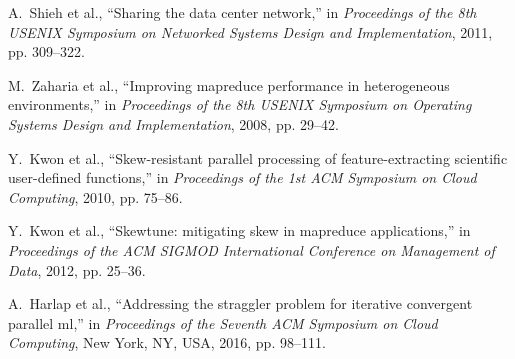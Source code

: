 \documentclass[10pt,journal,compsoc]{IEEEtran}
\begin{document}
\begin{thebibliography}{43}
A.~Shieh et al., ``Sharing the data
  center network,'' in \emph{Proceedings of the 8th USENIX Symposium on
  Networked Systems Design and Implementation}, 2011, pp. 309--322.

M.~Zaharia et al., ``Improving
  mapreduce performance in heterogeneous environments,'' in \emph{Proceedings
  of the 8th USENIX Symposium on Operating Systems Design and Implementation},
  2008, pp. 29--42.

Y.~Kwon et al., ``Skew-resistant parallel
  processing of feature-extracting scientific user-defined functions,'' in
  \emph{Proceedings of the 1st ACM Symposium on Cloud Computing}, 2010, pp. 75--86.

Y.~Kwon et al., ``Skewtune: mitigating skew in mapreduce applications,'' in
  \emph{Proceedings of the ACM SIGMOD International Conference on Management of
  Data}, 2012, pp. 25--36.

A.~Harlap et al., ``Addressing the straggler problem for iterative convergent
  parallel ml,'' in \emph{Proceedings of the Seventh ACM Symposium on Cloud
  Computing}, New York, NY, USA, 2016, pp. 98--111.


\end{thebibliography}

%
%

% 


\newpage
\end{document}

